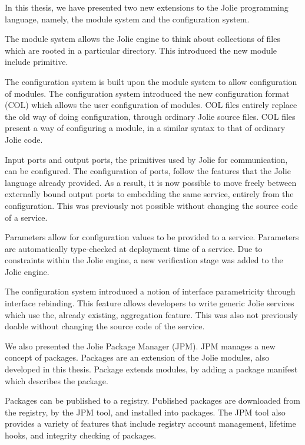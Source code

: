 In this thesis, we have presented two new extensions to the Jolie programming
language, namely, the module system and the configuration system.

The module system allows the Jolie engine to think about collections of files
which are rooted in a particular directory. This introduced the new module
include primitive.

The configuration system is built upon the module system to allow configuration
of modules. The configuration system introduced the new configuration format
(COL) which allows the user configuration of modules. COL files entirely
replace the old way of doing configuration, through ordinary Jolie source
files. COL files present a way of configuring a module, in a similar syntax to
that of ordinary Jolie code.

Input ports and output ports, the primitives used by Jolie for communication,
can be configured. The configuration of ports, follow the features that
the Jolie language already provided. As a result, it is now possible to
move freely between externally bound output ports to embedding the same
service, entirely from the configuration. This was previously not possible
without changing the source code of a service.

Parameters allow for configuration values to be provided to a service.
Parameters are automatically type-checked at deployment time of a service. Due
to constraints within the Jolie engine, a new verification stage was added to
the Jolie engine.

The configuration system introduced a notion of interface parametricity through
interface rebinding. This feature allows developers to write generic Jolie
services which use the, already existing, aggregation feature. This was also
not previously doable without changing the source code of the service.

We also presented the Jolie Package Manager (JPM). JPM manages a new concept of
packages. Packages are an extension of the Jolie modules, also developed in
this thesis. Package extends modules, by adding a package manifest which
describes the package.

Packages can be published to a registry. Published packages are downloaded from
the registry, by the JPM tool, and installed into packages.  The JPM tool also
provides a variety of features that include registry account management,
lifetime hooks, and integrity checking of packages.

